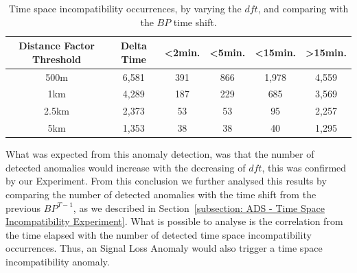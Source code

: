 \begin{table}[H]
\centering
\caption{Time space incompatibility occurrences, by varying the $dft$, and comparing with the $BP$ time shift.}
\label{Table: 5 Time Space}
\begin{tabular}{@{}cccccc@{}}
\toprule
Distance Factor Threshold & Delta Time & \textless{}2min. & \textless{}5min. & \textless{}15min. & \textgreater{}15min. \\ \midrule
500m & 6,581 & 391 & 866 & 1,978 & 4,559 \\
1km & 4,289 & 187 & 229 & 685 & 3,569 \\
2.5km & 2,373 & 53 & 53 & 95 & 2,257 \\
5km & 1,353 & 38 & 38 & 40 & 1,295 \\ \bottomrule
\end{tabular}
\end{table}

What was expected from this anomaly detection, was that the number of detected anomalies would increase with the decreasing of $dft$, this was confirmed by our Experiment. From this conclusion we further analysed this results by comparing the number of detected anomalies with the time shift from the previous $BP^{T-1}$, as we described in Section~\ref{subsection: ADS - Time Space Incompatibility Experiment}.
What is possible to analyse is the correlation from the time elapsed with the number of detected time space incompatibility occurrences. Thus, an Signal Loss Anomaly would also trigger a time space incompatibility anomaly.

